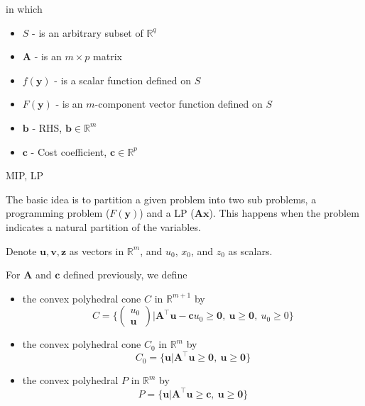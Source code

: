 			in which
			\begin{itemize}
				\item $S$ - is an arbitrary subset of $\mathbb{R}^q$
				\item $\mathbf{A}$ - is an $m \times p$ matrix
				\item $f(\mathbf{y})$ - is a scalar function defined on $S$
				\item $F(\mathbf{y})$ - is an $m$-component vector function defined on $S$
				\item $\mathbf{b}$ - RHS, $\mathbf{b} \in \mathbb{R}^m$
				\item $\mathbf{c}$ - Cost coefficient, $\mathbf{c} \in \mathbb{R}^p$
			\end{itemize}

			\begin{example}
				MIP, LP
			\end{example}

			The basic idea is to partition a given problem into two sub problems, a programming problem ($F(\mathbf{y})$) and a LP ($\mathbf{Ax}$). This happens when the problem indicates a natural partition of the variables.

			Denote $\mathbf{u}, \mathbf{v}, \mathbf{z}$ as vectors in $\mathbb{R}^m$, and $u_0$, $x_0$, and $z_0$ as scalars.

			For $\mathbf{A}$ and $\mathbf{c}$ defined previously, we define
			\begin{itemize}
				\item the convex polyhedral cone $C$ in $\mathbb{R}^{m + 1}$ by
				\begin{equation}
					C = \{\begin{pmatrix}u_0 \\ \mathbf{u}\end{pmatrix} | \mathbf{A}^\top \mathbf{u} - \mathbf{c} u_0 \ge \mathbf{0}, \ \mathbf{u} \ge \mathbf{0}, \ u_0 \ge 0\}
				\end{equation}
				\item the convex polyhedral cone $C_0$ in $\mathbb{R}^m$ by
				\begin{equation}
					C_0 = \{\mathbf{u} | \mathbf{A}^\top \mathbf{u} \ge \mathbf{0}, \ \mathbf{u} \ge \mathbf{0}\}
				\end{equation}
				\item the convex polyhedral $P$ in $\mathbb{R}^m$ by
				\begin{equation}
					P = \{\mathbf{u} | \mathbf{A}^\top \mathbf{u} \ge \mathbf{c}, \ \mathbf{u} \ge \mathbf{0}\}
				\end{equation}
			\end{itemize}

